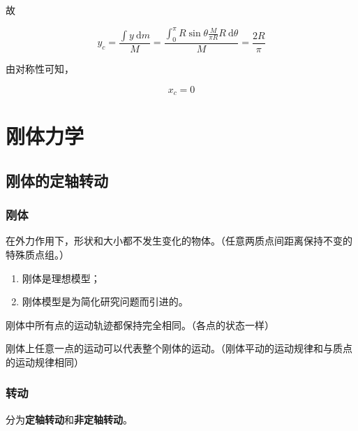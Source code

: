 \documentclass[
	12pt, %
	a4paper, %
]{myLegrandOrangeBook}
\begin{document}
    故

    $$
        y_c=\frac{\int y \mathrm{~d} m}{M}=\frac{\int_0^\pi R \sin \theta \frac{M}{\pi R} R \mathrm{~d} \theta}{M}=\frac{2 R}{\pi}
    $$

    由对称性可知，

    $$
        x_c = 0
    $$

\chapterspaceabove{6.25cm} %
\chapterspacebelow{7.5cm} %

\chapter{刚体力学}

\section{刚体的定轴转动}

\subsection{刚体}


    \begin{definition}[刚体]
    在外力作用下，形状和大小都不发生变化的物体。（任意两质点间距离保持不变的特殊质点组。）
    \end{definition}

    \begin{enumerate}
        \item 刚体是理想模型；
        \item 刚体模型是为简化研究问题而引进的。
    \end{enumerate}

    \vspace{1em}
    \begin{definition}[平动]
    刚体中所有点的运动轨迹都保持完全相同。（各点的状态一样）

    刚体上任意一点的运动可以代表整个刚体的运动。（刚体平动的运动规律和与质点的运动规律相同）
    \end{definition}

\subsection{转动}

    分为\textbf{定轴转动}和\textbf{非定轴转动}。
\end{document}
